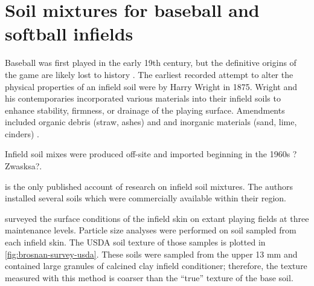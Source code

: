 \documentclass[
]{book}
\begin{document}
\hypertarget{soil-mixtures-for-baseball-and-softball-infields}{%
\section{Soil mixtures for baseball and softball infields}\label{soil-mixtures-for-baseball-and-softball-infields}}

Baseball was first played in the early 19th century, but the definitive origins of the game are likely lost to history \citep{Walker1994}. The earliest recorded attempt to alter the physical properties of an infield soil were by Harry Wright in 1875. Wright and his contemporaries incorporated various materials into their infield soils to enhance stability, firmness, or drainage of the playing surface. Amendments included organic debris (straw, ashes) and and inorganic materials (sand, lime, cinders) \citep{Morris2007}.

Infield soil mixes were produced off-site and imported beginning in the 1960s ?Zwasksa?.

\citet{Goodall2005} is the only published account of research on infield soil mixtures. The authors installed several soils which were commercially available within their region.

\citet{Brosnan2008a} surveyed the surface conditions of the infield skin on extant playing fields at three maintenance levels. Particle size analyses were performed on soil sampled from each infield skin. The USDA soil texture of those samples is plotted in \ref{fig:brosnan-survey-usda}. These soils were sampled from the upper 13 mm and contained large granules of calcined clay infield conditioner; therefore, the texture measured with this method is coarser than the ``true'' texture of the base soil.
\end{document}
